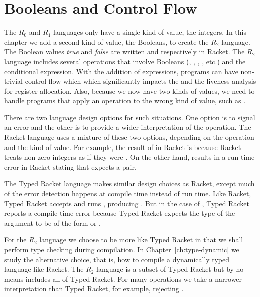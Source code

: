 \documentclass[11pt]{book}
\begin{document}
\chapter{Booleans and Control Flow}
\label{ch:bool-types}

The $R_0$ and $R_1$ languages only have a single kind of value, the
integers. In this chapter we add a second kind of value, the Booleans,
to create the $R_2$ language. The Boolean values \emph{true} and
\emph{false} are written  and  respectively in
Racket.  The $R_2$ language includes several operations that involve
Booleans (, , , \key{<}, etc.) and the
conditional  expression. With the addition of 
expressions, programs can have non-trivial control flow which which
significantly impacts the  and the liveness
analysis for register allocation. Also, because we now have two kinds
of values, we need to handle programs that apply an operation to the
wrong kind of value, such as .

There are two language design options for such situations.  One option
is to signal an error and the other is to provide a wider
interpretation of the operation. The Racket language uses a mixture of
these two options, depending on the operation and the kind of
value. For example, the result of  in Racket is
 because Racket treats non-zero integers as if they were
. On the other hand,  results in a run-time
error in Racket stating that  expects a pair.

The Typed Racket language makes similar design choices as Racket,
except much of the error detection happens at compile time instead of
run time. Like Racket, Typed Racket accepts and runs ,
producing . But in the case of , Typed Racket
reports a compile-time error because Typed Racket expects the type of
the argument to be of the form  or .

For the $R_2$ language we choose to be more like Typed Racket in that
we shall perform type checking during compilation. In
Chapter~\ref{ch:type-dynamic} we study the alternative choice, that
is, how to compile a dynamically typed language like Racket.  The
$R_2$ language is a subset of Typed Racket but by no means includes
all of Typed Racket. For many operations we take a narrower
interpretation than Typed Racket, for example, rejecting .
\end{document}
